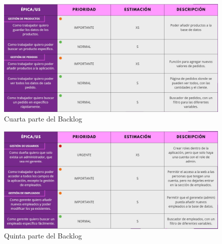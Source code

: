 \begin{figure}[h]
    \centering
    \includegraphics[width=1\textwidth]{figures/backlog-4.jpeg}
    \caption{Cuarta parte del Backlog}
    \label{fig:backlog4}
\end{figure}

\begin{figure}[h]
    \centering
    \includegraphics[width=1\textwidth]{figures/backlog-5.jpeg}
    \caption{Quinta parte del Backlog}
    \label{fig:backlog5}
\end{figure}
